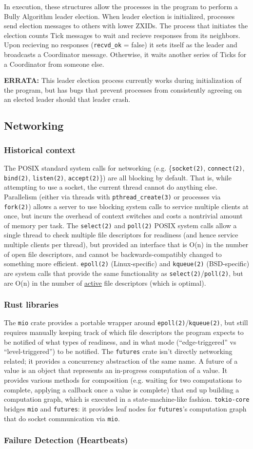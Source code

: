 \documentclass{article}
\begin{document}
	In execution, these structures allow the processes in the program to perform a Bully Algorithm leader election. When leader election is initialized, processes send election messages to others with lower ZXIDs. The process that initiates the election counts Tick messages to wait and recieve responses from its neighbors. Upon recieving no responses (\verb|recvd_ok| = false) it sets itself as the leader and broadcasts a Coordinator message. Otherwise, it waits another series of Ticks for a Coordinator from someone else. 

	\textbf{ERRATA:} This leader election process currently works during initialization of the program, but has bugs that prevent processes from consistently agreeing on an elected leader should that leader crash. 


\subsection*{Networking}
\subsubsection*{Historical context}
The POSIX standard system calls for networking (e.g. \{\verb|socket(2)|, \verb|connect(2)|, \verb|bind(2)|, \verb|listen(2)|, \verb|accept(2)|\}) are all blocking by default.
That is, while attempting to use a socket, the current thread cannot do anything else.
Parallelism (either via threads with \verb|pthread_create(3)| or processes via \verb|fork(2)|) allows a server to use blocking system calls to service multiple clients at once, but incurs the overhead of context switches and costs a nontrivial amount of memory per task.
The \verb|select(2)| and \verb|poll(2)| POSIX system calls allow a single thread to check multiple file descriptors for readiness (and hence service multiple clients per thread), but provided an interface that is O(n) in the number of open file descriptors, and cannot be backwards-compatibly changed to something more efficient.
\verb|epoll(2)| (Linux-specific) and \verb|kqueue(2)| (BSD-specific) are system calls that provide the same functionality as \verb|select(2)|/\verb|poll(2)|, but are O(n) in the number of \underline{active} file descriptors (which is optimal).
\subsubsection*{Rust libraries}
The \verb|mio| crate provides a portable wrapper around \verb|epoll(2)|/\verb|kqueue(2)|, but still requires manually keeping track of which file descriptors the program expects to be notified of what types of readiness, and in what mode (``edge-triggered'' vs ``level-triggered'') to be notified.
The \verb|futures| crate isn't directly networking related; it provides a concurrency abstraction of the same name.
A future of a value is an object that represents an in-progress computation of a value.
It provides various methods for composition (e.g. waiting for two computations to complete, applying a callback once a value is complete) that end up building a computation graph, which is executed in a state-machine-like fashion.
\verb|tokio-core| bridges \verb|mio| and \verb|futures|: it provides leaf nodes for \verb|futures|'s computation graph that do socket communication via \verb|mio|.
\subsubsection*{Failure Detection (Heartbeats)}
\end{document}
